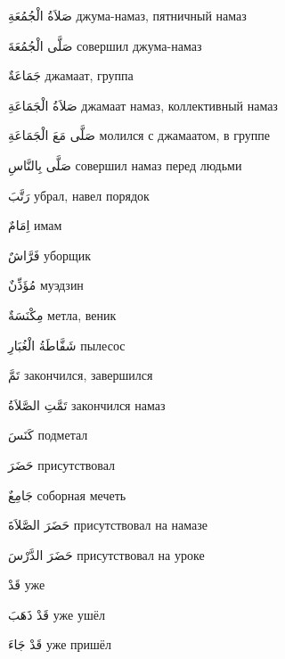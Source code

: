 \documentclass[a5paper]{article}
\newcommand\textstyleDropCaps[1]{#1}
\newcommand\textstyleCaptioncharacters[1]{#1}
\begin{document}
\textstyleCaptioncharacters{صَلاَةُ الْجُمُعَةِ }\textstyleDropCaps{джума-намаз, пятничный намаз‎}

\textstyleCaptioncharacters{صَلَّى الْجُمُعَةَ }\textstyleDropCaps{совер­шил джума-намаз‎}

\textstyleCaptioncharacters{جَمَاعَةٌ }\textstyleDropCaps{джамаат, группа‎}

\textstyleCaptioncharacters{صَلاَةُ الْجَمَاعَةِ }\textstyleDropCaps{джама­ат намаз, коллективный намаз‎}

\textstyleCaptioncharacters{صَلَّى مَعَ الْجَمَاعَةِ }\textstyleDropCaps{мо­лился с джамаатом, в группе‎}

\textstyleCaptioncharacters{صَلَّى بِالنَّاسِ }\textstyleDropCaps{совершил намаз перед людьми‎}

\textstyleCaptioncharacters{رَتَّبَ }\textstyleDropCaps{убрал, навел порядок‎}

\textstyleCaptioncharacters{اِمَامٌ }\textstyleDropCaps{имам‎}

\textstyleCaptioncharacters{فَرَّاشٌ }\textstyleDropCaps{уборщик‎}

\textstyleCaptioncharacters{مُؤَذِّنٌ }\textstyleDropCaps{муэдзин‎}

\textstyleCaptioncharacters{مِكْنَسَةٌ }\textstyleDropCaps{метла, веник‎}

\textstyleCaptioncharacters{شَفَّاطَةُ الْغُبَارِ }\textstyleDropCaps{пылесос‎}

\textstyleCaptioncharacters{تَمَّ }\textstyleDropCaps{закончился, завершился‎}

\textstyleCaptioncharacters{تَمَّتِ الصَّلاَةُ }\textstyleDropCaps{закончился намаз‎}

\textstyleCaptioncharacters{كَنَسَ }\textstyleDropCaps{подметал‎}

\textstyleCaptioncharacters{حَضَرَ }\textstyleDropCaps{присутствовал‎}

\textstyleCaptioncharacters{جَامِعٌ }\textstyleDropCaps{соборная мечеть‎}

\textstyleCaptioncharacters{حَضَرَ الصَّلاَةَ }\textstyleDropCaps{присут­ствовал на намазе‎}

\textstyleCaptioncharacters{حَضَرَ الدَّرْسَ }\textstyleDropCaps{присут­ствовал на уроке‎}

\textstyleCaptioncharacters{قَدْ }\textstyleDropCaps{уже‎}

\textstyleCaptioncharacters{قَدْ ذَهَبَ }\textstyleDropCaps{уже ушёл‎}

\textstyleCaptioncharacters{قَدْ جَاءَ }\textstyleDropCaps{уже пришёл‎}
\end{document}
